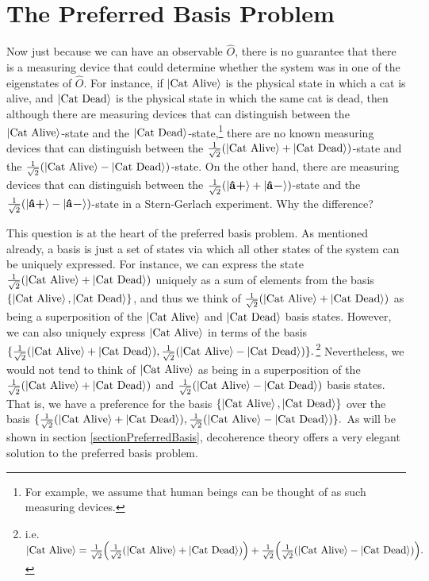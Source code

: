 \section{The Preferred Basis Problem\protect\footnotemark}
Now just because we can have an observable $\hat{O}$, there is no guarantee that there is a measuring device that could determine whether the system was in one of the eigenstates of $\hat{O}$. For instance, if $\ket{\text{Cat Alive}}$ is the physical state in which a cat is alive, and $\ket{\text{Cat Dead}}$ is the physical state in which the same cat is dead, then although there are measuring devices that can distinguish between the $\ket{\text{Cat Alive}}$-state and the $\ket{\text{Cat Dead}}$-state,\footnote{For example, we assume that human beings can be thought of as such measuring devices.} there are no known measuring devices that can distinguish between the $\frac{1}{\sqrt{2}}(\ket{\text{Cat Alive}}+\ket{\text{Cat Dead}})$-state and the $\frac{1}{\sqrt{2}}(\ket{\text{Cat Alive}}-\ket{\text{Cat Dead}})$-state. On the other hand, there are measuring devices that can distinguish between the $\frac{1}{\sqrt{2}}(\ket{\vb{\hat{{a}}}\bm{+}}+\ket{\vb{\hat{{a}}}\bm{-}})$-state and the $\frac{1}{\sqrt{2}}(\ket{\vb{\hat{{a}}}\bm{+}}-\ket{\vb{\hat{{a}}}\bm{-}})$-state in a Stern-Gerlach experiment. Why the difference?

This question is at the heart of the preferred basis problem. As mentioned already, a basis is just a set of states via which all other states of the system can be uniquely expressed. For instance, we can express the state $\frac{1}{\sqrt{2}}(\ket{\text{Cat Alive}}+\ket{\text{Cat Dead}})$ uniquely as a sum of elements from the basis $\{\ket{\text{Cat Alive}}, \ket{\text{Cat Dead}}\}$, and thus we think of $\frac{1}{\sqrt{2}}(\ket{\text{Cat Alive}}+\ket{\text{Cat Dead}})$ as being a superposition of the $\ket{\text{Cat Alive}}$ and $\ket{\text{Cat Dead}}$ basis states. However, we can also uniquely express  $\ket{\text{Cat Alive}}$ in terms of the basis $\{\frac{1}{\sqrt{2}}(\ket{\text{Cat Alive}}+\ket{\text{Cat Dead}}), \frac{1}{\sqrt{2}}(\ket{\text{Cat Alive}}-\ket{\text{Cat Dead}})\}.$\footnote{i.e. $\ket{\text{Cat Alive}}= \frac{1}{\sqrt{2}}\Big(\frac{1}{\sqrt{2}}(\ket{\text{Cat Alive}}+\ket{\text{Cat Dead}})\Big)+\frac{1}{\sqrt{2}}\Big( \frac{1}{\sqrt{2}}(\ket{\text{Cat Alive}}-\ket{\text{Cat Dead}})\Big). $} Nevertheless, we would not tend to think of $\ket{\text{Cat Alive}}$ as being in a superposition of the $\frac{1}{\sqrt{2}}(\ket{\text{Cat Alive}}+\ket{\text{Cat Dead}}) $ and $\frac{1}{\sqrt{2}}(\ket{\text{Cat Alive}}-\ket{\text{Cat Dead}})$ basis states. That is, we have a preference for the basis $\{\ket{\text{Cat Alive}}, \ket{\text{Cat Dead}}\}$ over the basis $\{\frac{1}{\sqrt{2}}(\ket{\text{Cat Alive}}+\ket{\text{Cat Dead}}), \frac{1}{\sqrt{2}}(\ket{\text{Cat Alive}}-\ket{\text{Cat Dead}})\}.$ As will be shown in section \ref{sectionPreferredBasis}, decoherence theory offers a very elegant solution to the preferred basis problem.
